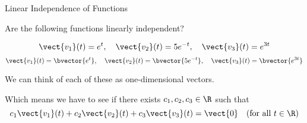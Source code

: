 \documentclass{beamer}
\begin{document}
\begin{frame}{Linear Independence of Functions}
\begin{example}
Are the following functions linearly independent?
\begin{overprint}
\begin{equation*}
\vect{v_1}(t)=e^t,\quad
\vect{v_2}(t)=5e^{-t},\quad
\vect{v_3}(t)=e^{3t}
\end{equation*}
\begin{equation*}
\vect{v_1}(t)=\bvector{e^t},\quad
\vect{v_2}(t)=\bvector{5e^{-t}},\quad
\vect{v_3}(t)=\bvector{e^{3t}}
\end{equation*}
\end{overprint}

\vspace{0.25cm}
We can think of each of these as one-dimensional vectors.

Which means we have to see if there exists $c_1,c_2,c_3\in\R$ such that
\begin{equation*}
c_1\vect{v_1}(t)+c_2\vect{v_2}(t)+c_3\vect{v_3}(t)=\vect{0}\quad (\text{for all $t\in\R$})
\end{equation*}


\end{example}
\end{frame}
\end{document}
